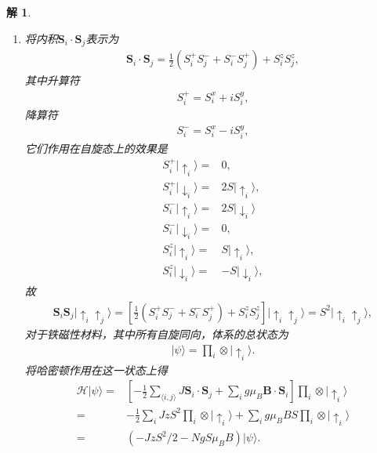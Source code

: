 \documentclass[UTF8,10pt,a4paper]{article}
\theoremstyle{Problem}
\theoremstyle{Solution}
\newtheorem*{sol}{解}
\begin{document}
\begin{sol}
    \begin{enumerate}
        \item[(a)] 将内积$\bm{S}_i\cdot\bm{S}_j$表示为
        \begin{align}
            \bm{S}_i\cdot\bm{S}_j=\frac{1}{2}(S_i^+S_j^-+S_i^-S_j^+)+S_i^zS_j^z,
        \end{align}
        其中升算符
        \begin{align}
            S_i^+=S_i^x+iS_i^y,
        \end{align}
        降算符
        \begin{align}
            S_i^-=S_i^x-iS_i^y,
        \end{align}
        它们作用在自旋态上的效果是
        \begin{align}
            S_i^+\lvert\uparrow_i\rangle=&0,\\
            S_i^+\lvert\downarrow_i\rangle=&2S\lvert\uparrow_i\rangle,\\
            S_i^-\lvert\uparrow_i\rangle=&2S\lvert\downarrow_i\rangle\\
            S_i^-\lvert\downarrow_i\rangle=&0,\\
            S_i^z\lvert\uparrow_i\rangle=&S\lvert\uparrow_i\rangle,\\
            S_i^z\lvert\downarrow_i\rangle=&-S\lvert\downarrow_i\rangle,
        \end{align}
        故
        \begin{align}
            \bm{S}_i\bm{S}_j\lvert\uparrow_i\uparrow_j\rangle=\left[\frac{1}{2}(S_i^+S_j^-+S_i^-S_j^+)+S_i^zS_j^z\right]\lvert\uparrow_i\uparrow_j\rangle=S^2\lvert\uparrow_i\uparrow_j\rangle,
        \end{align}
        对于铁磁性材料，其中所有自旋同向，体系的总状态为
        \begin{align}
            \lvert\psi\rangle=\prod_{i}\otimes\lvert\uparrow_i\rangle.
        \end{align}
        将哈密顿作用在这一状态上得
        \begin{align}
            \nonumber\mathcal{H}\lvert\psi\rangle=&\left[-\frac{1}{2}\sum_{\langle i,j\rangle}J\bm{S}_i\cdot\bm{S}_j+\sum_ig\mu_B\bm{B}\cdot\bm{S}_i\right]\prod_i\otimes\lvert\uparrow_i\rangle\\
            \nonumber=&-\frac{1}{2}\sum_iJzS^2\prod_i\otimes\lvert\uparrow_i\rangle+\sum_ig\mu_BBS\prod_i\otimes\lvert\uparrow_i\rangle\\
            =&(-JzS^2/2-NgS\mu_BB)\lvert\psi\rangle.

\end{align}
\end{enumerate}
\end{sol}
\end{document}
